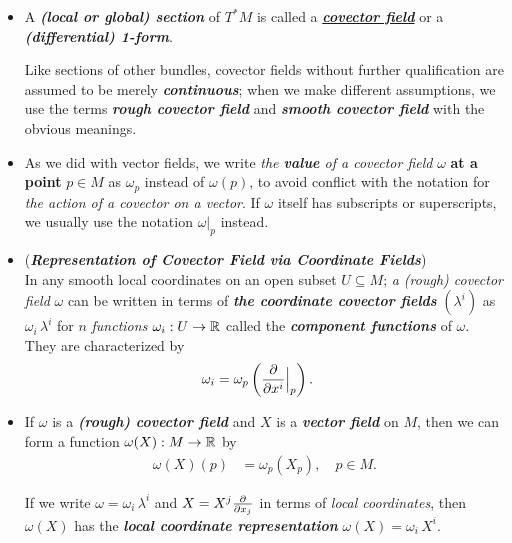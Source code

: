 \documentclass[11pt]{article}
\begin{document}
\begin{itemize}
\item
\begin{definition}
A \emph{\textbf{(local or global) section}} of $T^{*}M$ is called a \underline{\emph{\textbf{covector field}}} or a \emph{\textbf{(differential) 1-form}}.
\end{definition}

Like sections of other bundles, covector fields without further qualification are assumed to be merely \emph{\textbf{continuous}}; when we make different assumptions, we use the terms \emph{\textbf{rough covector field}} and \emph{\textbf{smooth covector field}} with the obvious meanings.

\item As we did with vector fields, we write \emph{the \textbf{value} of a covector field} $\omega$ \textbf{at a point} $p \in M$ as $\omega_p$ instead of $\omega(p)$, to avoid conflict with the notation for \emph{the action of a covector on a vector}. If $\omega$ itself has subscripts or superscripts, we usually use the notation $\omega|_{p}$ instead.

\item \begin{remark} (\emph{\textbf{Representation of Covector Field via Coordinate Fields}})\\
In any smooth local coordinates on an open subset $U \subseteq M$; \emph{a (rough) covector field} $\omega$ can be written in terms of \emph{\textbf{the coordinate covector fields}} $(\lambda^i)$ as  $\omega_{i}\,\lambda^i$ for $n$ \emph{functions} $\omega_i: U \rightarrow {\mathbb R}$ called the \emph{\textbf{component functions}} of $\omega$. They are characterized by
\begin{align*}
\omega_{i} &= \omega_{p}\left(\frac{\partial }{ \partial x^{i}}\Bigr|_{p}\right).
\end{align*}
\end{remark}

\item If $\omega$ is a \emph{\textbf{(rough) covector field}} and $X$ is a \emph{\textbf{vector field}} on $M$, then we can form a
function $\omega(X): M \rightarrow {\mathbb R}$ by
\begin{align*}
\omega(X)(p) &= \omega_{p}(X_{p}), \quad p \in M.
\end{align*}

If we write $\omega = \omega_i\,\lambda^i$ and $X = X^j \frac{\partial }{ \partial x_{j}}$ in terms of \emph{local coordinates}, then $\omega(X)$ has the \emph{\textbf{local coordinate representation}} $\omega(X) = \omega_i\, X^i$.


\end{itemize}
\end{document}
